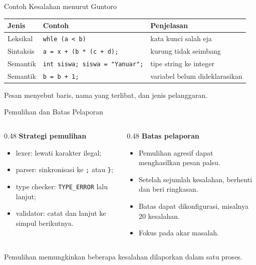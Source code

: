\documentclass[aspectratio=169,10pt,t]{beamer}
\begin{document}
\begin{frame}{Contoh Kesalahan menurut Guntoro}
  \scriptsize
  \setlength{\tabcolsep}{4pt}
  \begin{tabular}{@{}p{2.3cm}p{5.4cm}p{5.2cm}@{}}
    \toprule
    \textbf{Jenis} & \textbf{Contoh} & \textbf{Penjelasan} \\
    \midrule
    Leksikal & \texttt{whle (a < b)} & kata kunci salah eja \\
    Sintaksis & \texttt{a = x + (b * (c + d);} & kurung tidak seimbang \\
    Semantik & \texttt{int siswa; siswa = "Yanuar";} & tipe string
      ke integer \\
    Semantik & \texttt{b = b + 1;} & variabel belum dideklarasikan \\
    \bottomrule
  \end{tabular}

  \vspace{4pt}
  {\scriptsize\color{ubbblue!75}Pesan menyebut baris, nama yang
  terlibat, dan jenis pelanggaran.}
\end{frame}

\begin{frame}{Pemulihan dan Batas Pelaporan}
  \begin{columns}[T,onlytextwidth]
    \begin{column}{0.48\textwidth}
      \textbf{Strategi pemulihan}
      \begin{itemize}
        \item lexer: lewati karakter ilegal;
        \item parser: sinkronisasi ke \texttt{;} atau \texttt{\}};
        \item type checker: \texttt{TYPE\_ERROR} lalu lanjut;
        \item validator: catat dan lanjut ke simpul berikutnya.
      \end{itemize}
    \end{column}
    \begin{column}{0.48\textwidth}
      \textbf{Batas pelaporan}
      \begin{itemize}
        \item Pemulihan agresif dapat menghasilkan pesan palsu.
        \item Setelah sejumlah kesalahan, berhenti dan beri ringkasan.
        \item Batas dapat dikonfigurasi, misalnya 20 kesalahan.
        \item Fokus pada akar masalah.
      \end{itemize}
    \end{column}
  \end{columns}

  \vspace{4pt}
  {\footnotesize\color{ubbblue!80}Pemulihan memungkinkan beberapa
  kesalahan dilaporkan dalam satu proses.}
\end{frame}
\end{document}
